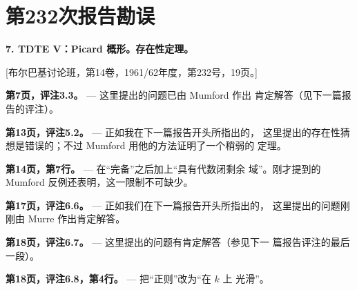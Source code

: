 \clearpage
\chapter*{第232次报告勘误}

\noindent\textbf{7. TDTE V：Picard 概形。存在性定理。}

\begin{center}
[布尔巴基讨论班，第14卷，1961/62年度，第232号，19页。]
\end{center}

\noindent\textbf{第7页，评注3.3。} --- 这里提出的问题已由 Mumford 作出
肯定解答（见下一篇报告的评注）。

\noindent\textbf{第13页，评注5.2。} --- 正如我在下一篇报告开头所指出的，
这里提出的存在性猜想是错误的；不过 Mumford 用他的方法证明了一个稍弱的
定理。

\noindent\textbf{第14页，第7行。} --- 在“完备”之后加上“具有代数闭剩余
域”。刚才提到的 Mumford 反例还表明，这一限制不可缺少。

\noindent\textbf{第17页，评注6.6。} --- 正如我们在下一篇报告开头所指出的，
这里提出的问题刚刚由 Murre 作出肯定解答。

\noindent\textbf{第18页，评注6.7。} --- 这里提出的问题有肯定解答（参见下一
篇报告评注的最后一段）。

\noindent\textbf{第18页，评注6.8，第4行。} --- 把“正则”改为“在 $k$ 上
光滑”。
